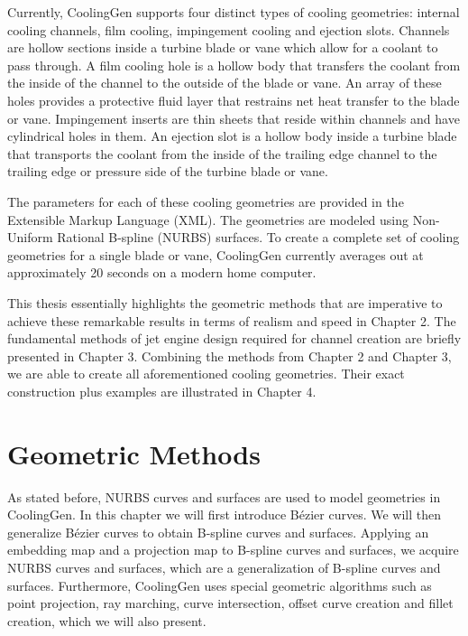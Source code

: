 \documentclass[a4paper, 11pt]{report}
\theoremstyle{definition}
\begin{document}
	Currently, CoolingGen supports four distinct types of cooling geometries: internal cooling channels, film cooling, impingement cooling and ejection slots. Channels are hollow sections inside a turbine blade or vane which allow for a coolant to pass through. A film cooling hole is a hollow body that transfers the coolant from the inside of the channel to the outside of the blade or vane. An array of these holes provides a protective fluid layer that restrains net heat transfer to the blade or vane. Impingement inserts are thin sheets that reside within channels and have cylindrical holes in them. An ejection slot is a hollow body inside a turbine blade that transports the coolant from the inside of the trailing edge  channel to the trailing edge or pressure side of the turbine blade or vane.

	The parameters for each of these cooling geometries are provided in the Extensible Markup Language (XML). The geometries are modeled using Non-Uniform Rational B-spline (NURBS) surfaces. To create a complete set of cooling geometries for a single blade or vane, CoolingGen currently averages out at approximately 20 seconds on a modern home computer.

	This thesis essentially highlights the geometric methods that are imperative to achieve these remarkable results in terms of realism and speed in Chapter 2. The fundamental methods of jet engine design required for channel creation are briefly presented in Chapter 3. Combining the methods from Chapter 2 and Chapter 3, we are able to create all aforementioned cooling geometries. Their exact construction plus examples are illustrated in Chapter 4.


\chapter{Geometric Methods}\label{chap:methods}
	As stated before, NURBS curves and surfaces are used to model geometries in CoolingGen. In this chapter we will first introduce Bézier curves. We will then generalize Bézier curves to obtain B-spline curves and surfaces. Applying an embedding map and a projection map to B-spline curves and surfaces, we acquire NURBS curves and surfaces, which are a generalization of B-spline curves and surfaces. Furthermore, CoolingGen uses special geometric algorithms such as point projection, ray marching, curve intersection, offset curve creation and fillet creation, which we will also present.
\end{document}
